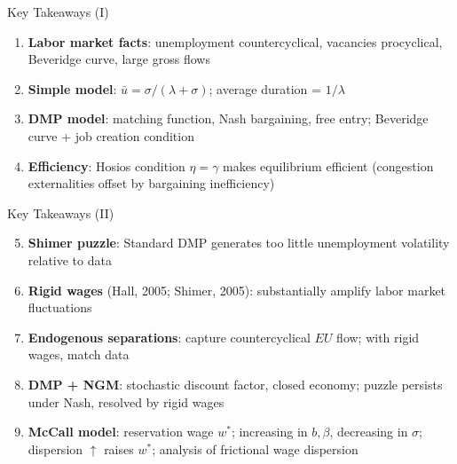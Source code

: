 \documentclass[blue]{beamer}
\begin{document}
	\begin{frame}{Key Takeaways (I)}
		\begin{enumerate}
			\item \textbf{Labor market facts}: unemployment countercyclical, vacancies procyclical, Beveridge curve, large gross flows
			
			\item \textbf{Simple model}: $\bar{u} = \sigma/(\lambda + \sigma)$; average duration = $1/\lambda$
			
			\item \textbf{DMP model}: matching function, Nash bargaining, free entry; Beveridge curve + job creation condition
			
			\item \textbf{Efficiency}: Hosios condition $\eta = \gamma$ makes equilibrium efficient (congestion externalities offset by bargaining inefficiency)
			

		\end{enumerate}
	\end{frame}
		\begin{frame}{Key Takeaways (II)}
		\begin{enumerate}
		\setcounter{enumi}{4}
			
			\item \textbf{Shimer puzzle}: Standard DMP generates too little unemployment volatility relative to data
			
			\item \textbf{Rigid wages} (Hall, 2005; Shimer, 2005): substantially amplify labor market fluctuations
			
			\item \textbf{Endogenous separations}: capture countercyclical $EU$ flow; with rigid wages, match data
			
			\item \textbf{DMP + NGM}: stochastic discount factor, closed economy; puzzle persists under Nash, resolved by rigid wages
			
			\item \textbf{McCall model}: reservation wage $w^*$; increasing in $b, \beta$, decreasing in $\sigma$; dispersion $\uparrow$ raises $w^*$; analysis of frictional wage dispersion
		\end{enumerate}
	\end{frame}
\end{document}
